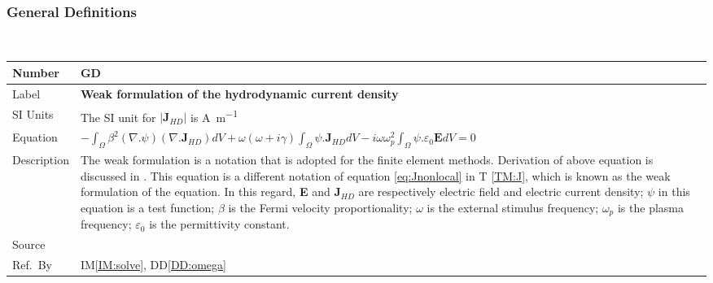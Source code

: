 \documentclass[12pt]{article}
\newcommand{\colBwidth}{0.82\textwidth} \newcommand{\colCwidth}{0.1\textwidth}
\newcounter{defnum} %
\begin{document}
	~\newline
	
	
	\subsubsection{General Definitions}\label{sec_gendef}
	~\newline \noindent \begin{minipage}{\textwidth}
		\renewcommand*{\arraystretch}{1.5} \begin{tabular}{| p{\colAwidth} |
				p{\colBwidth}|} \hline \rowcolor[gray]{0.9} Number&
			GD{defnum}\thedefnum \label{GD:weakJ}\\ \hline Label &\bf Weak
			formulation of the hydrodynamic current density  \\ \hline %
			SI Units& The SI unit for $|\textbf{J}_{HD}|$ is \si{\ampere \per \metre}\\
			\hline Equation& $-\int_\Omega
			\beta^2(\nabla.\psi)(\nabla.\textbf{J}_{HD})dV+\omega(\omega+i\gamma)\int_{\Omega} \psi. \textbf{J}_{HD} dV - i\omega \omega^2_p \int_\Omega \psi.\varepsilon_{0}\textbf{E}dV = 0 $ \\ \hline Description & The weak formulation is a notation that is adopted for the finite element methods. Derivation of above equation is discussed in \cite{hiremath2012numerical}. This equation is a different notation of equation \ref{eq:Jnonlocal} in T \ref{TM:J}, which is known as the weak formulation of the equation. In this regard, \textbf{E} and \textbf{J}$_{HD}$ are respectively electric field and electric current density; $\psi$ in this equation is a test function; $\beta$ is the Fermi velocity proportionality; $\omega$ is the external stimulus frequency; $\omega_p$ is the plasma frequency; $\varepsilon_{0}$ is the permittivity constant.    \\ \hline Source & \cite{hiremath2012numerical}  \\ \hline Ref.\ By & IM\ref{IM:solve}, DD\ref{DD:omega}\\ \hline \end{tabular} \end{minipage}\\
	
	
	~\newline
	
\end{document}
